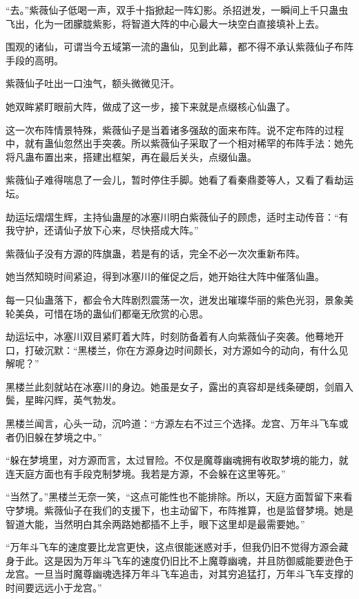 
\begin{this_body}

“去。”紫薇仙子低喝一声，双手十指掀起一阵幻影。杀招迸发，一瞬间上千只蛊虫飞出，化为一团朦胧紫影，将智道大阵的中心最大一块空白直接填补上去。

围观的诸仙，可谓当今五域第一流的蛊仙，见到此幕，都不得不承认紫薇仙子布阵手段的高明。

紫薇仙子吐出一口浊气，额头微微见汗。

她双眸紧盯眼前大阵，做成了这一步，接下来就是点缀核心仙蛊了。

这一次布阵情景特殊，紫薇仙子是当着诸多强敌的面来布阵。说不定布阵的过程中，就有蛊仙忽然出手突袭。所以紫薇仙子采取了一个相对稀罕的布阵手法：她先将凡蛊布置出来，搭建出框架，再在最后关头，点缀仙蛊。

紫薇仙子难得喘息了一会儿，暂时停住手脚。她看了看秦鼎菱等人，又看了看劫运坛。

劫运坛熠熠生辉，主持仙蛊屋的冰塞川明白紫薇仙子的顾虑，适时主动传音：“有我守护，还请仙子放下心来，尽快搭成大阵。”

紫薇仙子没有方源的阵旗蛊，若是有的话，完全不必一次次重新布阵。

她当然知晓时间紧迫，得到冰塞川的催促之后，她开始往大阵中催落仙蛊。

每一只仙蛊落下，都会令大阵剧烈震荡一次，迸发出璀璨华丽的紫色光羽，景象美轮美奂，可惜在场的蛊仙们都毫无欣赏的心思。

劫运坛中，冰塞川双目紧盯着大阵，时刻防备着有人向紫薇仙子突袭。他蓦地开口，打破沉默：“黑楼兰，你在方源身边时间颇长，对方源如今的动向，有什么见解呢？”

黑楼兰此刻就站在冰塞川的身边。她虽是女子，露出的真容却是线条硬朗，剑眉入鬓，星眸闪辉，英气勃发。

黑楼兰闻言，心头一动，沉吟道：“方源左右不过三个选择。龙宫、万年斗飞车或者仍旧躲在梦境之中。”

“躲在梦境里，对方源而言，太过冒险。不仅是魔尊幽魂拥有收取梦境的能力，就连天庭方面也有手段克制梦境。我若是方源，不会躲在这里等死。”

“当然了。”黑楼兰无奈一笑，“这点可能性也不能排除。所以，天庭方面暂留下来看守梦境。紫薇仙子在我们的支援下，也主动留下，布阵推算，也是监督梦境。她是智道大能，当然明白其余两路她都插不上手，眼下这里却是最需要她。”

“万年斗飞车的速度要比龙宫更快，这点很能迷惑对手，但我仍旧不觉得方源会藏身于此。这是因为万年斗飞车的速度仍旧比不上魔尊幽魂，并且防御威能要逊色于龙宫。一旦当时魔尊幽魂选择万年斗飞车追击，对其穷追猛打，万年斗飞车支撑的时间要远远小于龙宫。”


\end{this_body}
